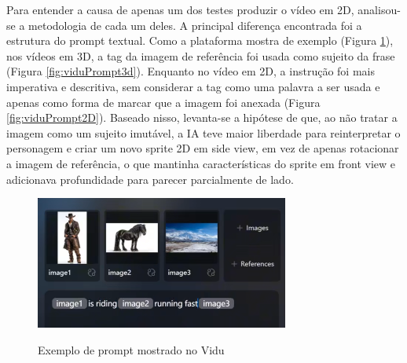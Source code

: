 Para entender a causa de apenas um dos testes produzir o vídeo em 2D, analisou-se a metodologia de cada um deles. A principal diferença encontrada foi a estrutura do prompt textual. Como a plataforma mostra de exemplo (Figura \ref{fig:viduPromptExemplo}), nos vídeos em 3D, a tag da imagem de referência foi usada como sujeito da frase (Figura \ref{fig:viduPrompt3d}). Enquanto no vídeo em 2D, a instrução foi mais imperativa e descritiva, sem considerar a tag como uma palavra a ser usada e apenas como forma de marcar que a imagem foi anexada (Figura \ref{fig:viduPrompt2D}). Baseado nisso, levanta-se a hipótese de que, ao não tratar a imagem como um sujeito imutável, a IA teve maior liberdade para reinterpretar o personagem e criar um novo sprite 2D em side view, em vez de apenas rotacionar a imagem de referência, o que mantinha características do sprite em front view e adicionava profundidade para parecer parcialmente de lado.

\begin{figure}[htbp]
    \centering
    \caption{\small Exemplo de prompt mostrado no Vidu}
    \includegraphics[width=0.6\linewidth]{figs/vidu/promptEx.PNG}
    \label{fig:viduPromptExemplo}
\end{figure}

